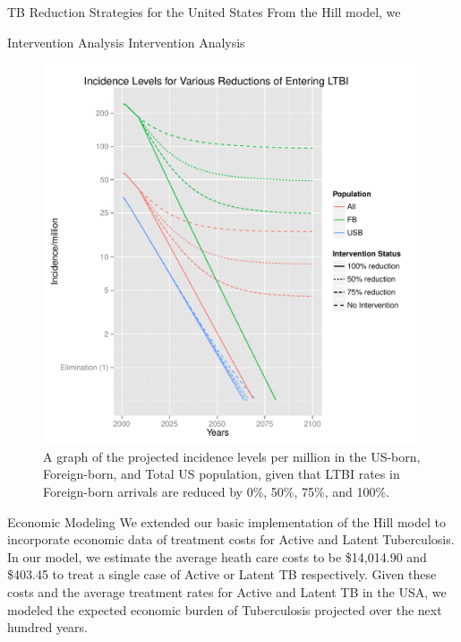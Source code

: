 \documentclass[final]{beamer}
\begin{document}
\begin{frame}
\begin{columns}
    \begin{column}{.3\textwidth}
      \begin{block}{TB Reduction Strategies for the United States}
        From the Hill model, we 
      \end{block}
      \begin{block}{Intervention Analysis}
        Intervention Analysis
        \begin{figure}[h]
          \begin{center}
            \includegraphics[scale=1]{incidencePlotRedEnLTBI.pdf}
          \end{center}
          \caption{A graph of the projected incidence levels per million in
                       the US-born, Foreign-born, and Total US population, given
                       that LTBI rates in Foreign-born arrivals are reduced by 
                       0\%, 50\%, 75\%, and 100\%.}
          \label{fig:redEnLTBI_incidence}
        \end{figure}
      \end{block}
      \begin{block}{Economic Modeling}
        We extended our basic implementation of the Hill model to incorporate
        economic data of treatment costs for Active and Latent Tuberculosis.  
        In our model, we estimate the average heath care costs to be \$14,014.90
        and \$403.45 to treat a single case of Active or Latent TB respectively.  
        Given these costs and the average treatment rates for Active and Latent
        TB in the USA, we modeled the expected economic burden of Tuberculosis
        projected over the next hundred years.  


\end{block}
\end{column}
\end{columns}
\end{frame}
\end{document}
